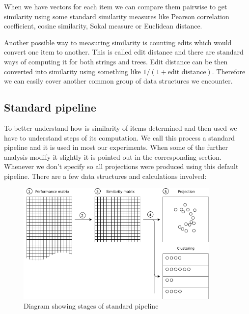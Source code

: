 \documentclass[
  digital, %
  table,   %
  nolof,     %
  nolot,     %
  nocover,
  color,
  final, %
]{fithesis3}
\begin{document}
When we have vectors for each item we can compare them pairwise to get similarity using some standard similarity measures like Pearson correlation coefficient, cosine similarity, Sokal measure or Euclidean distance.


Another possible way to measuring similarity is counting edits which would convert one item to another. This is called edit distance and there are standard ways of computing it for both strings and trees. Edit distance can be then converted into similarity using something like $1 / (1 + \text{edit distance})$. Therefore we can easily cover another common group of data structures we encounter.


\subsection{Standard pipeline}\label{standard-pipeline}


To better understand how is similarity of items determined and then used we have to understand steps of its computation. We call this process a standard pipeline and it is used in most our experiments. When some of the further analysis modify it slightly it is pointed out in the corresponding section. Whenever we don't specify so all projections were produced using this default pipeline. There are a few data structures and calculations involved:

\begin{figure}
  \includegraphics[width=10cm]{img/pipeline_diagram}
  \caption{Diagram showing stages of standard pipeline}
  \label{fig:pipeline_diagram}
\end{figure}
\end{document}
